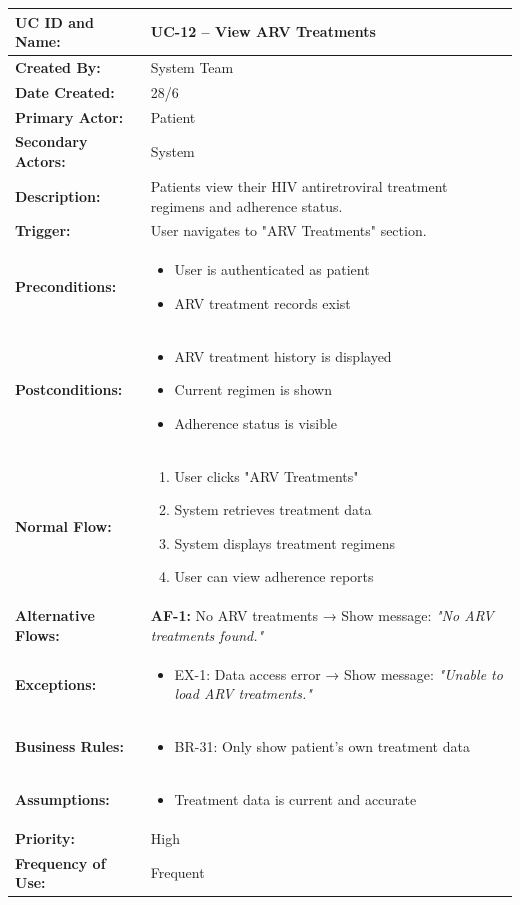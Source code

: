 \documentclass[12pt,a4paper]{article}
\begin{document}
\renewcommand{\arraystretch}{1.5}
\begin{longtable}{|p{4.5cm}|p{10.5cm}|}
\hline
\textbf{UC ID and Name:} & UC-12 – View ARV Treatments \\
\hline
\textbf{Created By:} & System Team \\
\hline
\textbf{Date Created:} & 28/6 \\
\hline
\textbf{Primary Actor:} & Patient \\
\hline
\textbf{Secondary Actors:} & System \\
\hline
\textbf{Description:} & Patients view their HIV antiretroviral treatment regimens and adherence status. \\
\hline
\textbf{Trigger:} & User navigates to "ARV Treatments" section. \\
\hline
\textbf{Preconditions:} &
\begin{itemize}
  \item User is authenticated as patient
  \item ARV treatment records exist
\end{itemize} \\
\hline
\textbf{Postconditions:} &
\begin{itemize}
  \item ARV treatment history is displayed
  \item Current regimen is shown
  \item Adherence status is visible
\end{itemize} \\
\hline
\textbf{Normal Flow:} &
\begin{enumerate}
  \item User clicks "ARV Treatments"
  \item System retrieves treatment data
  \item System displays treatment regimens
  \item User can view adherence reports
\end{enumerate} \\
\hline
\textbf{Alternative Flows:} &
\textbf{AF-1:} No ARV treatments → Show message: \textit{"No ARV treatments found."} \\
\hline
\textbf{Exceptions:} &
\begin{itemize}
  \item EX-1: Data access error → Show message: \textit{"Unable to load ARV treatments."}
\end{itemize} \\
\hline
\textbf{Business Rules:} &
\begin{itemize}
  \item BR-31: Only show patient's own treatment data
\end{itemize} \\
\hline
\textbf{Assumptions:} &
\begin{itemize}
  \item Treatment data is current and accurate
\end{itemize} \\
\hline
\textbf{Priority:} & High \\
\hline
\textbf{Frequency of Use:} & Frequent \\
\hline
\end{longtable}
\end{document}
